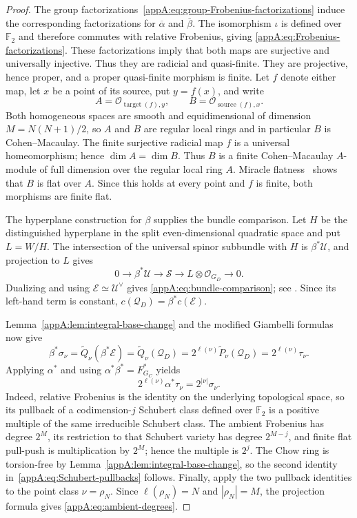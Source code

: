 \documentclass[11pt,a4paper,oneside]{amsart}
\numberwithin{equation}{section}
\theoremstyle{definition}
\theoremstyle{remark}
\begin{document}
\begin{proof}
The group factorizations~\eqref{appA:eq:group-Frobenius-factorizations}
induce the corresponding factorizations for $\overline\alpha$ and
$\overline\beta$.  The isomorphism $\iota$ is defined over $\mathbb F_2$
and therefore commutes with relative Frobenius, giving
\eqref{appA:eq:Frobenius-factorizations}.  These factorizations imply that both maps are surjective and universally
injective.  Thus they are radicial and quasi-finite.  They are projective, hence
proper, and a proper quasi-finite morphism is finite.  Let $f$ denote either map, let $x$ be a point of its source, put
$y=f(x)$, and write
\[
 A=\mathcal O_{\operatorname{target}(f),y},\qquad
 B=\mathcal O_{\operatorname{source}(f),x}.
\]
Both homogeneous spaces are smooth and equidimensional of dimension
$M=N(N+1)/2$, so $A$ and $B$ are regular local rings and in particular $B$
is Cohen--Macaulay.  The finite surjective radicial map $f$ is a universal
homeomorphism; hence $\dim A=\dim B$.  Thus $B$ is a finite
Cohen--Macaulay $A$-module of full dimension over the regular local ring
$A$.  Miracle flatness~\cite[Tag~00R4]{Stacks} shows that $B$ is flat over
$A$.  Since this holds at every point and $f$ is finite, both morphisms are
finite flat.

The hyperplane construction for $\beta$ supplies the bundle comparison.
Let $H$ be the distinguished hyperplane in the split even-dimensional
quadratic space and put $L=W/H$.  The intersection of the universal spinor
subbundle with $H$ is $\beta^*\mathcal U$, and projection to $L$ gives
\[
  0\longrightarrow\beta^*\mathcal U
  \longrightarrow\mathcal S
  \longrightarrow L\otimes\mathcal O_{G_D}
  \longrightarrow0.
\]
Dualizing and using $\mathcal E\simeq\mathcal U^\vee$ gives
\eqref{appA:eq:bundle-comparison}; see
\cite[\S\S5.1--5.3]{VGM19}.  Since its left-hand term is constant,
$c(\mathcal Q_D)=\beta^*c(\mathcal E)$.

Lemma~\ref{appA:lem:integral-base-change} and the modified Giambelli formulas
now give
\[
  \beta^*\sigma_\nu
  =\widetilde Q_\nu(\beta^*\mathcal E)
  =\widetilde Q_\nu(\mathcal Q_D)
  =2^{\ell(\nu)}\widetilde P_\nu(\mathcal Q_D)
  =2^{\ell(\nu)}\tau_\nu.
\]
Applying $\alpha^*$ and using
$\alpha^*\beta^*=F_{G_C}^*$ yields
\[
  2^{\ell(\nu)}\alpha^*\tau_\nu
  =2^{|\nu|}\sigma_\nu.
\]
Indeed, relative Frobenius is the identity on the underlying topological
space, so its pullback of a codimension-$j$ Schubert class defined over
$\mathbb F_2$ is a positive multiple of the same irreducible Schubert class.
The ambient Frobenius has degree $2^M$, its restriction to that Schubert
variety has degree $2^{M-j}$, and finite flat pull-push is multiplication by
$2^M$; hence the multiple is $2^j$.  The Chow ring is
torsion-free by Lemma~\ref{appA:lem:integral-base-change}, so the second
identity in~\eqref{appA:eq:Schubert-pullbacks} follows.  Finally, apply the
two pullback identities to the point class $\nu=\rho_N$.  Since
$\ell(\rho_N)=N$ and $|\rho_N|=M$, the projection formula gives
\eqref{appA:eq:ambient-degrees}.
\end{proof}
\end{document}
